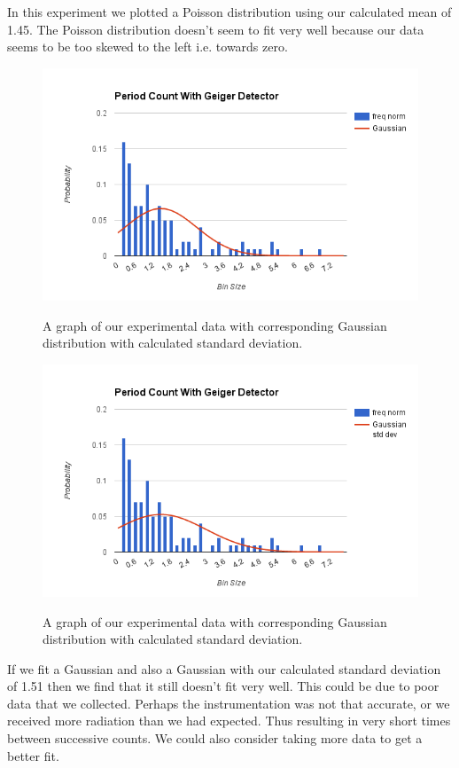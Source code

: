 \documentclass[12pt letterpaper]{article}
\begin{document}
In this experiment we plotted a Poisson distribution using our calculated mean of 1.45. The Poisson distribution doesn't seem to fit very well because our data seems to be too skewed to the left i.e. towards zero. 

\begin{figure}[H]
  \caption{A graph of our experimental data with corresponding Gaussian distribution with calculated standard deviation.}
  \centering
    \includegraphics[width=.75\textwidth]{section1_2_1_gaussian.png}
    \label{fig:section1.2.1gaussian}
\end{figure}

\begin{figure}[H]
  \caption{A graph of our experimental data with corresponding Gaussian distribution with calculated standard deviation.}
  \centering
    \includegraphics[width=.75\textwidth]{section1_2_1_gaussian_std_dev.png}
    \label{fig:section1.2.1gaussianstddev}
\end{figure}

If we fit a Gaussian and also a Gaussian with our calculated standard deviation of 1.51 then we find that it still doesn't fit very well. This could be due to poor data that we collected. Perhaps the instrumentation was not that accurate, or we received more radiation than we had expected. Thus resulting in very short times between successive counts. We could also consider taking more data to get a better fit. 
\end{document}
